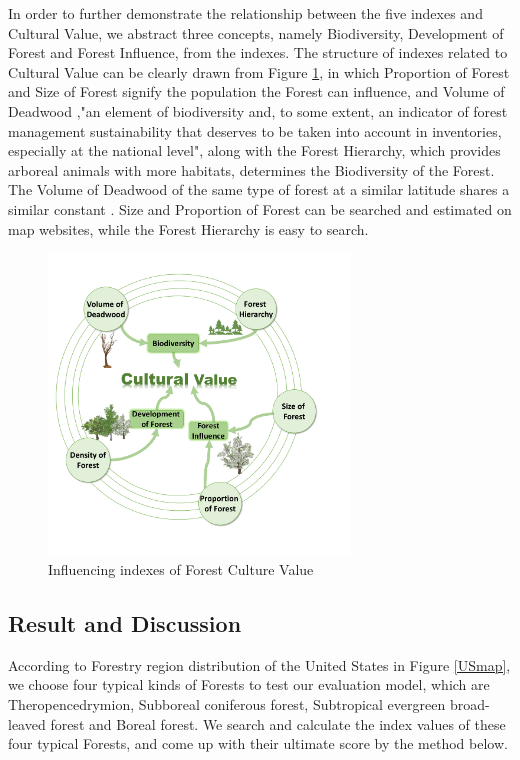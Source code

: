 \documentclass{mcmthesis}
\numberwithin{figure}{section}
\numberwithin{table}{section}
\numberwithin{equation}{section}
\begin{document}
\par
In order to further demonstrate the relationship between the five indexes and 
Cultural Value, we abstract three concepts, namely Biodiversity, Development of 
Forest and Forest Influence, from the indexes. The structure of indexes related to 
Cultural Value can be clearly drawn from Figure \ref{Index_CulVal}, 
in which Proportion of Forest and Size
of Forest signify the population the Forest can influence, and Volume of Deadwood
,"an element of biodiversity and, to some extent, an indicator of forest 
management sustainability that deserves to be taken into account in inventories,
especially at the national level"\citep{rondeux2010review}, along with the 
Forest Hierarchy, which provides arboreal 
animals with more habitats, determines the Biodiversity of the Forest.
The Volume of Deadwood of the same type of forest at a similar latitude shares a similar 
constant \citep{2007US}. Size and Proportion of Forest can be searched and estimated on 
map websites, while the Forest Hierarchy is easy to search. 
\begin{figure}[htbp]
  \centering
  \includegraphics[width = 8cm]{code&pic/Model2.pdf}
  \caption{Influencing indexes of Forest Culture Value}\label{Index_CulVal}
\end{figure}

\subsection{Result and Discussion}

According to Forestry region distribution of the United States in Figure \ref{USmap}, 
we choose four typical kinds of Forests to test our evaluation model, which are
Theropencedrymion, Subboreal coniferous forest, Subtropical 
evergreen broad-leaved forest and Boreal forest. We search and calculate the index values
of these four typical Forests, and come up with their ultimate score by the method below.
\end{document}
